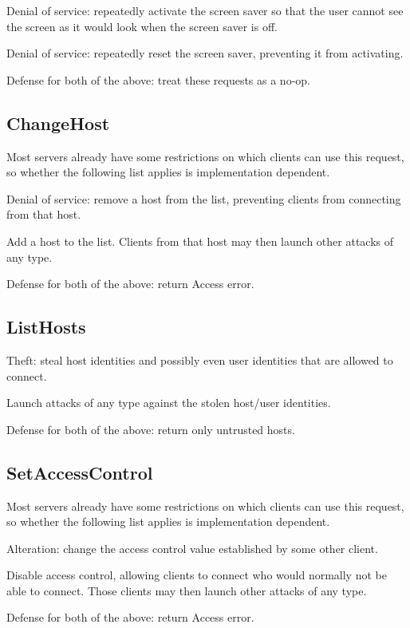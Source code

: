 Denial of service: repeatedly activate the screen saver so that the
user cannot see the screen as it would look when the screen saver
is off.

Denial of service: repeatedly reset the screen saver, preventing it
from activating.

Defense for both of the above: treat these requests as a no-op.



\subsection{ChangeHost}

Most servers already have some restrictions on which clients can use
this request, so whether the following list applies is implementation
dependent.

Denial of service: remove a host from the list, preventing clients
from connecting from that host.

Add a host to the list.  Clients from that host may then launch
other attacks of any type.

Defense for both of the above: return Access error.


\subsection{ListHosts}

Theft: steal host identities and possibly even user identities that
are allowed to connect.

Launch attacks of any type against the stolen host/user identities.

Defense for both of the above: return only untrusted hosts.



\subsection{SetAccessControl}

Most servers already have some restrictions on which clients can use
this request, so whether the following list applies is implementation
dependent.

Alteration: change the access control value established by some other
client.

Disable access control, allowing clients to connect who would normally
not be able to connect.  Those clients may then launch other attacks
of any type.

Defense for both of the above: return Access error.



